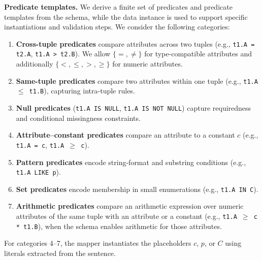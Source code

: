 \smallskip\noindent\textbf{Predicate templates.}
We derive a finite set of predicates and predicate templates from the schema, while the data instance is used to support specific instantiations and validation steps. We consider the following categories:
\begin{enumerate}
    \item \textbf{Cross-tuple predicates} compare attributes across two tuples (e.g., \texttt{t1.A = t2.A}, \texttt{t1.A > t2.B}). We allow $\{=,\neq\}$ for type-compatible attributes and additionally $\{<,\leq,>,\geq\}$ for numeric attributes.
    \item \textbf{Same-tuple predicates} compare two attributes within one tuple (e.g., \texttt{t1.A $\leq$ t1.B}), capturing intra-tuple rules.
    \item \textbf{Null predicates} (\texttt{t1.A IS NULL}, \texttt{t1.A IS NOT NULL}) capture requiredness and conditional missingness constraints.
    \item \textbf{Attribute--constant predicates} compare an attribute to a constant $c$ (e.g., \texttt{t1.A = c}, \texttt{t1.A $\geq$ c}).
    \item \textbf{Pattern predicates} encode string-format and substring conditions (e.g., \texttt{t1.A LIKE p}).
    \item \textbf{Set predicates} encode membership in small enumerations (e.g., \texttt{t1.A IN C}).
    \item \textbf{Arithmetic predicates} compare an arithmetic expression over numeric attributes of the same tuple with an attribute or a constant (e.g., \texttt{t1.A $\geq$ c * t1.B}), when the schema enables arithmetic for those attributes.
\end{enumerate}
For categories 4--7, the mapper instantiates the placeholders $c$, $p$, or $C$ using literals extracted from the sentence.



